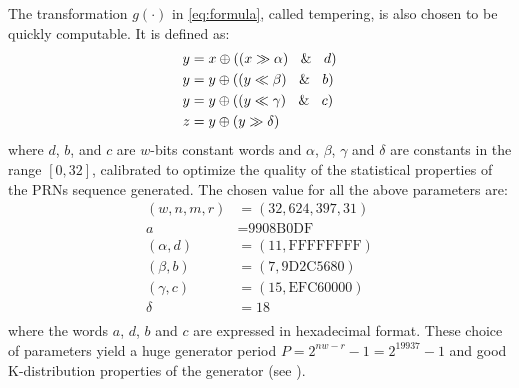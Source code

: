 \documentclass[preprint,1p,times]{elsarticle}
\begin{document}
	The transformation $g(\cdot)$ in \eqref{eq:formula}, called tempering, is also chosen to be quickly computable. It is defined as:
	\begin{equation}
		\label{eq:tempering}
		\begin{aligned}
			y &= x \oplus ((x\gg \alpha)~\And~d)\\
			y &= y \oplus ((y\ll \beta)~\And~b)\\
			y &= y \oplus ((y\ll \gamma)~\And~c)\\
			z &= y \oplus (y\gg \delta)
		\end{aligned}
	\end{equation}
	where $d$, $b$, and $c$ are $w$-bits constant words and $\alpha$, $\beta$, $\gamma$ and $\delta$ are constants in the range $[0,32]$, calibrated to optimize the quality of the statistical properties of the PRNs sequence generated. The chosen value for all the above parameters are:
	\begin{equation}
		\label{eq:params}
		\begin{aligned}
			(w, n, m, r) &= (32, 624, 397, 31)\\
			a &= \textrm{9908B0DF}\\
			(\alpha, d) &= (11, \textrm{FFFFFFFF})\\
			(\beta, b) &= (7, \textrm{9D2C5680})\\
			(\gamma, c) &= (15, \textrm{EFC60000})\\
			\delta &= 18\\
		\end{aligned}
	\end{equation}
	where the words $a$, $d$, $b$ and $c$ are expressed in hexadecimal format. These choice of parameters yield a huge generator period $P=2^{nw-r}\!-\!1=2^{19937}\!-\!1$ and good K-distribution properties of the generator (see \cite{mt19937}).
	
\end{document}
